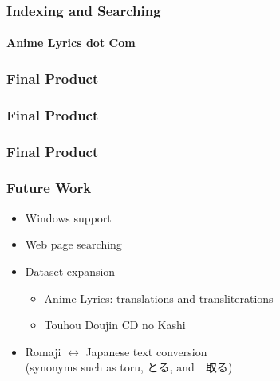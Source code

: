 \documentclass{beamer}
\begin{document}
\begin{CJK}{UTF8}{zhsong}
\begin{frame}
\end{frame}
\begin{frame}
\frametitle{Indexing and Searching}
\framesubtitle{Anime Lyrics dot Com}
\end{frame}
\begin{frame}
\frametitle{Final Product}
\end{frame}
\begin{frame}
\frametitle{Final Product}
\end{frame}
\begin{frame}
\frametitle{Final Product}
\end{frame}
\begin{frame}
\frametitle{Future Work}
\begin{itemize}
\item Windows support
\item Web page searching
\item Dataset expansion
\begin{itemize}
\item Anime Lyrics: translations and transliterations
\item Touhou Doujin CD no Kashi
\end{itemize}
\item Romaji $ \leftrightarrow $ Japanese text conversion \\ (synonyms such as toru, とる, and　取る)
\end{itemize}
\end{frame}
\end{CJK}
\end{document}
